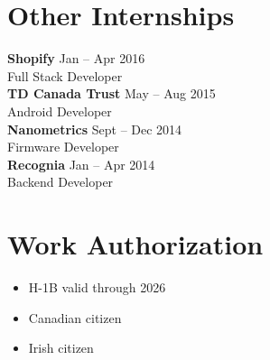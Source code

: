 \documentclass[letterpaper,10pt]{article}
\newcommand{\comment}[1]{}
\newcommand{\tinytitle}[4]{
    {\large \textbf{#1}}
    \hfill
    {\footnotesize#4}
    \\
    #2
    \\
}
\begin{document}
\begin{minipage}[t]{0.34\textwidth}
\medskip
\section{Other Internships}
\medskip

\tinytitle{Shopify}{Full Stack Developer}{Ruby on Rails, MySQL}{Jan -- Apr 2016}
\comment{
\begin{itemize}
    \item {Created mobile phone payment method for merchants in developing countries, especially those with low credit card penetration}
    \item {Created Postmates and UberRush local delivery integrations}
\end{itemize}
\bigskip
}

\tinytitle{TD Canada Trust}{Android Developer}{Java, AngularJS}{May -- Aug 2015}
\comment{
\begin{itemize}
    \item{Prototyped Android apps to explore new technologies applied to banking (e.g. internet of things)}
\end{itemize}
\bigskip
}

\tinytitle{Nanometrics}{Firmware Developer}{C++, bash}{Sept -- Dec 2014}
\comment{
\begin{itemize}
    \item {Developed firmware for seismometers}
    \item {Verified \& debugged prototype PCBs}
\end{itemize}
\bigskip
}


\tinytitle{Recognia}{Backend Developer}{Java, Perl, PostgreSQL, AngularJS}{Jan -- Apr 2014}
\comment{
{\footnotesize
 \hfill Jan  -- Apr 2014\\
}
\begin{itemize}
    \item{Built backend and API for website for technical analysis of financial instruments}
    \item{Created new caching strategy, reducing cache misses by 60\%}
\end{itemize}
}

\medskip
\section{Work Authorization}
\begin{itemize}[leftmargin=0.125in]
    \item{H-1B valid through 2026}
    \item{Canadian citizen}
    \item{Irish citizen}

\end{itemize}

\end{minipage}
\end{document}
